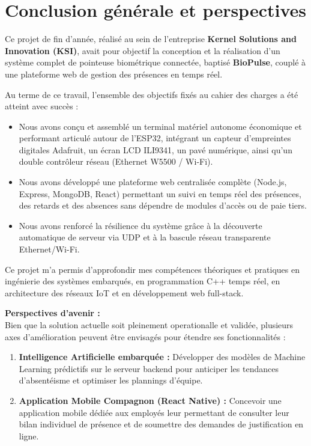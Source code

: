 \documentclass[12pt,a4paper]{report}
\begin{document}
\chapter*{Conclusion générale et perspectives}

Ce projet de fin d'année, réalisé au sein de l'entreprise \textbf{Kernel Solutions and Innovation (KSI)}, avait pour objectif la conception et la réalisation d'un système complet de pointeuse biométrique connectée, baptisé \textbf{BioPulse}, couplé à une plateforme web de gestion des présences en temps réel.

Au terme de ce travail, l'ensemble des objectifs fixés au cahier des charges a été atteint avec succès :
\begin{itemize}
    \item Nous avons conçu et assemblé un terminal matériel autonome économique et performant articulé autour de l'ESP32, intégrant un capteur d'empreintes digitales Adafruit, un écran LCD ILI9341, un pavé numérique, ainsi qu'un double contrôleur réseau (Ethernet W5500 / Wi-Fi).
    \item Nous avons développé une plateforme web centralisée complète (Node.js, Express, MongoDB, React) permettant un suivi en temps réel des présences, des retards et des absences sans dépendre de modules d'accès ou de paie tiers.
    \item Nous avons renforcé la résilience du système grâce à la découverte automatique de serveur via UDP et à la bascule réseau transparente Ethernet/Wi-Fi.
\end{itemize}

Ce projet m'a permis d'approfondir mes compétences théoriques et pratiques en ingénierie des systèmes embarqués, en programmation C++ temps réel, en architecture des réseaux IoT et en développement web full-stack.

\vspace{0.5cm}
\noindent \textbf{Perspectives d'avenir :} \\
Bien que la solution actuelle soit pleinement operationalle et validée, plusieurs axes d'amélioration peuvent être envisagés pour étendre ses fonctionnalités :
\begin{enumerate}
    \item \textbf{Intelligence Artificielle embarquée :} Développer des modèles de Machine Learning prédictifs sur le serveur backend pour anticiper les tendances d'absentéisme et optimiser les plannings d'équipe.
    \item \textbf{Application Mobile Compagnon (React Native) :} Concevoir une application mobile dédiée aux employés leur permettant de consulter leur bilan individuel de présence et de soumettre des demandes de justification en ligne.
\end{enumerate}
\end{document}
